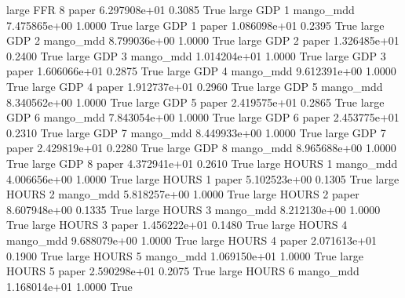      large      FFR                 8                 paper 6.297908e+01      0.3085    True
     large      GDP                 1             mango_mdd 7.475865e+00      1.0000    True
     large      GDP                 1                 paper 1.086098e+01      0.2395    True
     large      GDP                 2             mango_mdd 8.799036e+00      1.0000    True
     large      GDP                 2                 paper 1.326485e+01      0.2400    True
     large      GDP                 3             mango_mdd 1.014204e+01      1.0000    True
     large      GDP                 3                 paper 1.606066e+01      0.2875    True
     large      GDP                 4             mango_mdd 9.612391e+00      1.0000    True
     large      GDP                 4                 paper 1.912737e+01      0.2960    True
     large      GDP                 5             mango_mdd 8.340562e+00      1.0000    True
     large      GDP                 5                 paper 2.419575e+01      0.2865    True
     large      GDP                 6             mango_mdd 7.843054e+00      1.0000    True
     large      GDP                 6                 paper 2.453775e+01      0.2310    True
     large      GDP                 7             mango_mdd 8.449933e+00      1.0000    True
     large      GDP                 7                 paper 2.429819e+01      0.2280    True
     large      GDP                 8             mango_mdd 8.965688e+00      1.0000    True
     large      GDP                 8                 paper 4.372941e+01      0.2610    True
     large    HOURS                 1             mango_mdd 4.006656e+00      1.0000    True
     large    HOURS                 1                 paper 5.102523e+00      0.1305    True
     large    HOURS                 2             mango_mdd 5.818257e+00      1.0000    True
     large    HOURS                 2                 paper 8.607948e+00      0.1335    True
     large    HOURS                 3             mango_mdd 8.212130e+00      1.0000    True
     large    HOURS                 3                 paper 1.456222e+01      0.1480    True
     large    HOURS                 4             mango_mdd 9.688079e+00      1.0000    True
     large    HOURS                 4                 paper 2.071613e+01      0.1900    True
     large    HOURS                 5             mango_mdd 1.069150e+01      1.0000    True
     large    HOURS                 5                 paper 2.590298e+01      0.2075    True
     large    HOURS                 6             mango_mdd 1.168014e+01      1.0000    True
